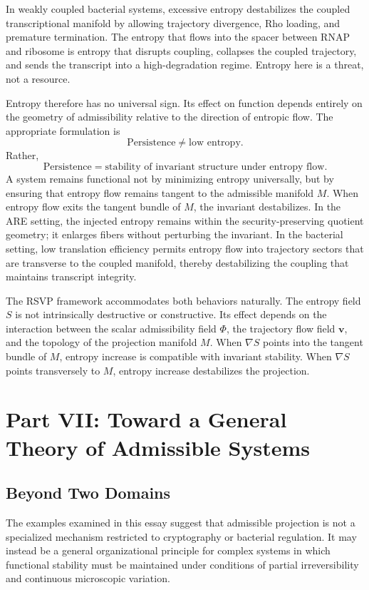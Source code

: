 \documentclass[12pt, a4paper]{article}
\theoremstyle{essaystyle}
\begin{document}
In weakly coupled bacterial systems, excessive entropy destabilizes the coupled
transcriptional manifold by allowing trajectory divergence, Rho loading, and premature
termination. The entropy that flows into the spacer between RNAP and ribosome is
entropy that disrupts coupling, collapses the coupled trajectory, and sends the
transcript into a high-degradation regime. Entropy here is a threat, not a resource.

Entropy therefore has no universal sign. Its effect on function depends entirely on
the geometry of admissibility relative to the direction of entropic flow. The
appropriate formulation is
\[
\text{Persistence} \neq \text{low entropy}.
\]
Rather,
\[
\text{Persistence} = \text{stability of invariant structure under entropy flow}.
\]
A system remains functional not by minimizing entropy universally, but by ensuring that
entropy flow remains tangent to the admissible manifold $M$. When entropy flow exits the
tangent bundle of $M$, the invariant destabilizes. In the ARE setting, the injected
entropy remains within the security-preserving quotient geometry; it enlarges fibers
without perturbing the invariant. In the bacterial setting, low translation efficiency
permits entropy flow into trajectory sectors that are transverse to the coupled
manifold, thereby destabilizing the coupling that maintains transcript integrity.

The RSVP framework accommodates both behaviors naturally. The entropy field $S$ is not
intrinsically destructive or constructive. Its effect depends on the interaction between
the scalar admissibility field $\Phi$, the trajectory flow field $\mathbf{v}$, and the
topology of the projection manifold $M$. When $\nabla S$ points into the tangent bundle
of $M$, entropy increase is compatible with invariant stability. When $\nabla S$ points
transversely to $M$, entropy increase destabilizes the projection.

\section{Part VII: Toward a General Theory of Admissible Systems}

\subsection{Beyond Two Domains}

The examples examined in this essay suggest that admissible projection is not a
specialized mechanism restricted to cryptography or bacterial regulation. It may instead
be a general organizational principle for complex systems in which functional stability
must be maintained under conditions of partial irreversibility and continuous microscopic
variation.
\end{document}

